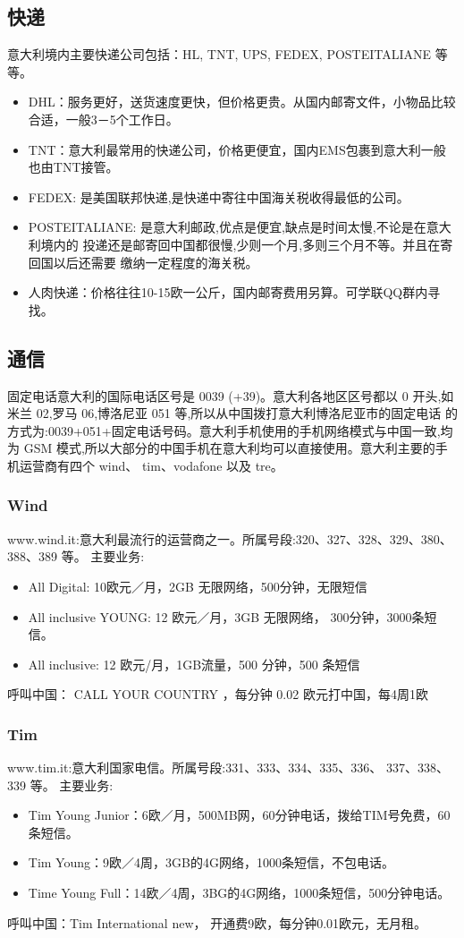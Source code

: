 \subsection{快递}
意大利境内主要快递公司包括：HL, TNT, UPS, FEDEX, POSTEITALIANE 等等。
\begin{itemize}
\item DHL：服务更好，送货速度更快，但价格更贵。从国内邮寄文件，小物品比较合适，一般3－5个工作日。
\item TNT：意大利最常用的快递公司，价格更便宜，国内EMS包裹到意大利一般也由TNT接管。
\item FEDEX: 是美国联邦快递,是快递中寄往中国海关税收得最低的公司。
\item POSTEITALIANE: 是意大利邮政,优点是便宜,缺点是时间太慢,不论是在意大利境内的 投递还是邮寄回中国都很慢,少则一个月,多则三个月不等。并且在寄回国以后还需要
缴纳一定程度的海关税。
\item 人肉快递：价格往往10-15欧一公斤，国内邮寄费用另算。可学联QQ群内寻找。
\end{itemize}

\subsection{通信}
固定电话意大利的国际电话区号是 0039 (+39)。意大利各地区区号都以 0 开头,如米兰 02,罗马 06,博洛尼亚 051 等,所以从中国拨打意大利博洛尼亚市的固定电话 的方式为:0039+051+固定电话号码。意大利手机使用的手机网络模式与中国一致,均为 GSM 模式,所以大部分的中国手机在意大利均可以直接使用。意大利主要的手机运营商有四个 wind、 tim、vodafone 以及 tre。 

\subsubsection{Wind}
www.wind.it:意大利最流行的运营商之一。所属号段:320、327、328、329、380、 388、389 等。
主要业务:
\begin{itemize}
\item All Digital: 10欧元／月，2GB 无限网络，500分钟，无限短信
\item All inclusive YOUNG:  12 欧元／月，3GB 无限网络， 300分钟，3000条短信。
\item All inclusive:  12 欧元/月，1GB流量，500 分钟，500 条短信
\end{itemize}
呼叫中国： CALL YOUR COUNTRY ，每分钟 0.02 欧元打中国，每4周1欧

\subsubsection{Tim}
www.tim.it:意大利国家电信。所属号段:331、333、334、335、336、 337、338、339 等。
主要业务:
\begin{itemize}
\item Tim Young Junior：6欧／月，500MB网，60分钟电话，拨给TIM号免费，60条短信。
\item Tim Young：9欧／4周，3GB的4G网络，1000条短信，不包电话。
\item Time Young Full：14欧／4周，3BG的4G网络，1000条短信，500分钟电话。
\end{itemize}
呼叫中国：Tim International new， 开通费9欧，每分钟0.01欧元，无月租。

